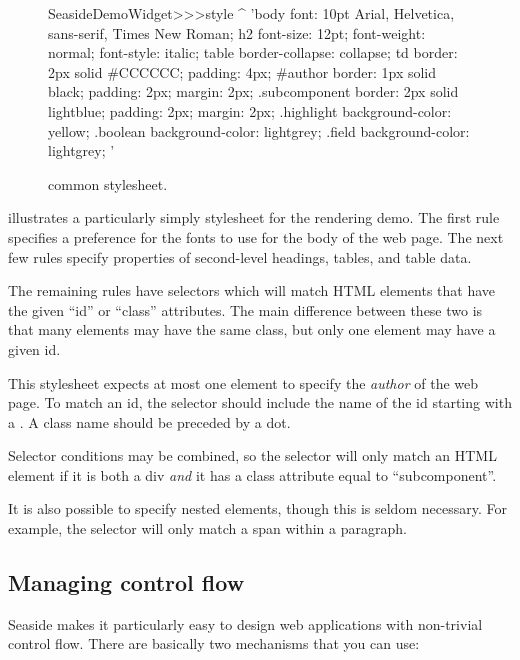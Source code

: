 \documentclass[a4paper,10pt,twoside]{book}
\begin{document}
\begin{figure}[ht]
\begin{code}{}
SeasideDemoWidget>>>style
	^ 'body {
	font: 10pt Arial, Helvetica, sans-serif, Times New Roman;
}
h2 {
	font-size: 12pt;
	font-weight: normal;
	font-style: italic;
}
table { border-collapse: collapse; }
td {
	border: 2px solid #CCCCCC;
	padding: 4px;
}
#author {
	border: 1px solid black;
	padding: 2px;
	margin: 2px;
}
.subcomponent {
	border: 2px solid lightblue;
	padding: 2px;
	margin: 2px;
}
.highlight { background-color: yellow; }
.boolean { background-color: lightgrey; }
.field { background-color: lightgrey; }'
\end{code}
\caption{ common stylesheet.
\label{fig:democss}}
\end{figure}
 illustrates a particularly simply stylesheet for the rendering demo.
The first rule specifies a preference for the fonts to use for the body of the web page.
The next few rules specify properties of second-level headings, tables, and table data.

The remaining rules have selectors which will match HTML elements that have the given ``id'' or ``class'' attributes.
The main difference between these two is that many elements may have the same class, but only one element may have a given id.

This stylesheet expects at most one element to specify the \emph{author} of the web page.
To match an id, the selector should include the name of the id starting with a \ct{#}.
A class name should be preceded by a dot.

Selector conditions may be combined, so the selector  will only match an HTML element if it is both a div \emph{and} it has a class attribute equal to ``subcomponent''.

It is also possible to specify nested elements, though this is seldom necessary.
For example, the selector  will only match a span within a paragraph.


\subsection{Managing control flow}

Seaside makes it particularly easy to design web applications with non-trivial control flow.
There are basically two mechanisms that you can use:
\end{document}
